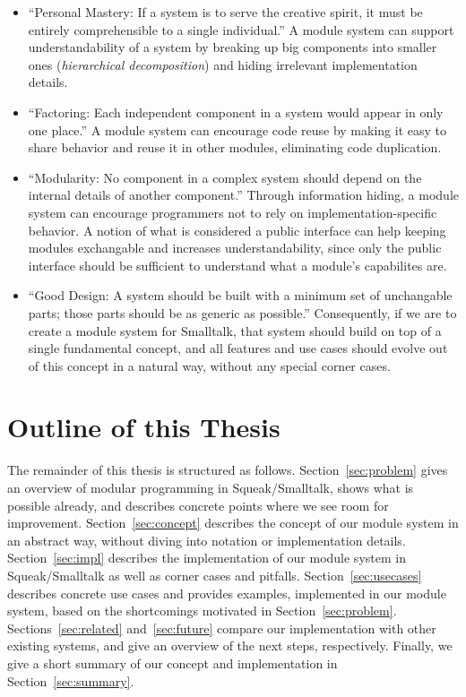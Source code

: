 \begin{itemize}
	\item ``Personal Mastery: If a system is to serve the creative spirit, it must be entirely comprehensible to a single individual.'' A module system can support understandability of a system by breaking up big components into smaller ones (\emph{hierarchical decomposition}) and hiding irrelevant implementation details.
	\item ``Factoring: Each independent component in a system would appear in only one place.'' A module system can encourage code reuse by making it easy to share behavior and reuse it in other modules, eliminating code duplication. %
	\item ``Modularity: No component in a complex system should depend on the internal details of another component.'' Through information hiding, a module system can encourage programmers not to rely on implementation-specific behavior. A notion of what is considered a public interface can help keeping modules exchangable and increases understandability, since only the public interface should be sufficient to understand what a module's capabilites are.
	\item ``Good Design: A system should be built with a minimum set of unchangable parts; those parts should be as generic as possible.'' Consequently, if we are to create a module system for Smalltalk, that system should build on top of a single fundamental concept, and all features and use cases should evolve out of this concept in a natural way, without any special corner cases.
\end{itemize}

\section{Outline of this Thesis}
The remainder of this thesis is structured as follows. Section~\ref{sec:problem} gives an overview of modular programming in Squeak/Smalltalk, shows what is possible already, and describes concrete points where we see room for improvement. Section~\ref{sec:concept} describes the concept of our module system in an abstract way, without diving into notation or implementation details. Section~\ref{sec:impl} describes the implementation of our module system in Squeak/Smalltalk as well as corner cases and pitfalls. Section~\ref{sec:usecases} describes concrete use cases and provides examples, implemented in our module system, based on the shortcomings motivated in Section~\ref{sec:problem}. Sections~\ref{sec:related} and~\ref{sec:future} compare our implementation with other existing systems, and give an overview of the next steps, respectively. Finally, we give a short summary of our concept and implementation in Section~\ref{sec:summary}.

